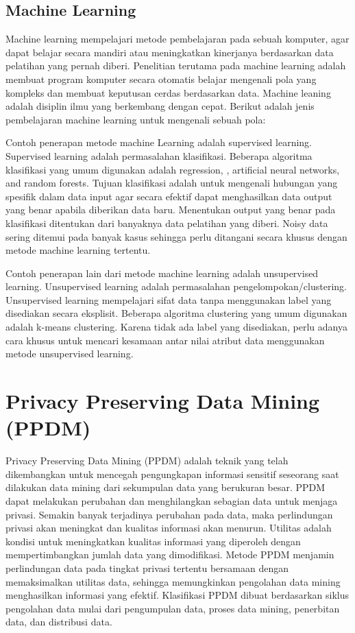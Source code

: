 \subsection{Machine Learning} 
Machine learning mempelajari metode pembelajaran pada sebuah komputer, agar dapat belajar secara mandiri atau meningkatkan kinerjanya berdasarkan data pelatihan yang pernah diberi. Penelitian terutama pada machine learning adalah membuat program komputer secara otomatis belajar mengenali pola yang kompleks dan membuat keputusan cerdas berdasarkan data. Machine leaning adalah disiplin ilmu yang berkembang dengan cepat. Berikut adalah jenis pembelajaran machine learning untuk mengenali sebuah pola:

\par Contoh penerapan metode machine Learning adalah supervised learning. Supervised learning  adalah permasalahan klasifikasi. Beberapa algoritma klasifikasi yang umum digunakan adalah regression, , artificial neural networks, and random forests. Tujuan klasifikasi adalah untuk mengenali hubungan yang spesifik dalam data input agar secara efektif dapat menghasilkan data output yang benar apabila diberikan data baru. Menentukan output yang benar pada klasifikasi ditentukan dari banyaknya data pelatihan yang diberi. Noisy data  sering ditemui pada banyak kasus sehingga perlu ditangani secara khusus dengan metode machine learning tertentu.

\par Contoh penerapan lain dari metode machine learning adalah unsupervised learning. Unsupervised learning adalah permasalahan pengelompokan/clustering. Unsupervised learning mempelajari sifat data tanpa menggunakan label yang disediakan secara eksplisit. Beberapa algoritma clustering yang umum digunakan adalah k-means clustering. Karena tidak ada label yang disediakan, perlu adanya cara khusus untuk mencari kesamaan antar nilai atribut data menggunakan metode unsupervised learning.

\section{Privacy Preserving Data Mining (PPDM)} 
Privacy Preserving Data Mining (PPDM) adalah teknik yang telah dikembangkan untuk mencegah pengungkapan informasi sensitif seseorang saat dilakukan data mining dari sekumpulan data yang berukuran besar. PPDM dapat melakukan perubahan dan  menghilangkan sebagian data untuk menjaga privasi. Semakin banyak terjadinya perubahan pada data, maka perlindungan privasi akan meningkat dan kualitas informasi akan menurun.  Utilitas adalah kondisi untuk meningkatkan kualitas informasi yang diperoleh dengan mempertimbangkan jumlah data yang dimodifikasi. Metode PPDM menjamin perlindungan data pada tingkat privasi tertentu bersamaan dengan memaksimalkan utilitas data, sehingga memungkinkan pengolahan data mining menghasilkan informasi yang efektif. Klasifikasi PPDM dibuat berdasarkan siklus pengolahan data mulai dari pengumpulan data, proses data mining, penerbitan data, dan distribusi data.

